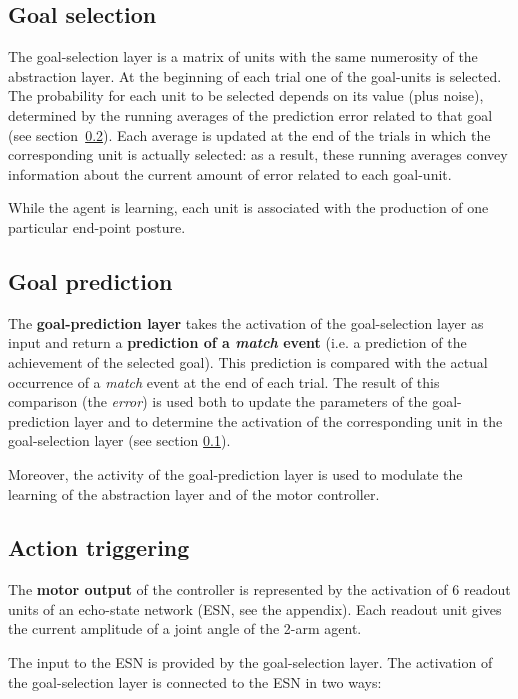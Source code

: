 \documentclass[11pt]{article}
\begin{document}
\subsection{Goal selection}
\label{sec:selection}

The goal-selection layer is a matrix of units with the same
numerosity of the abstraction layer. At the beginning of
each trial one of the goal-units is selected. The
probability for each unit to be selected depends on its
value (plus noise), determined by the running averages of
the prediction error related to that goal (see
section~\ref{sec:prediction}). Each average is updated at
the end of the trials in which the corresponding unit is
actually selected: as a result, these running averages
convey information about the current amount of error
related to each goal-unit. 

While the agent is learning, each unit is associated with
the production of one particular end-point posture. 

\subsection{Goal prediction}
\label{sec:prediction}

The \textbf{goal-prediction layer} takes the activation of
the goal-selection layer as input and return a
\textbf{prediction of a \emph{match} event} (i.e. a
prediction of the achievement of the selected goal). This
prediction is compared with the actual occurrence of a
\emph{match} event at the end of each trial.
The result of this comparison (the \emph{error}) is used
both to update the parameters of the goal-prediction layer
and to determine the activation of the corresponding unit in
the goal-selection layer (see section
\ref{sec:selection}).

Moreover, the activity of the goal-prediction layer is used
to modulate the learning of the abstraction layer and of the
motor controller.


\subsection{Action triggering}
\label{sec:actiontriggering}

The \textbf{motor output} of the controller is represented
by the activation of 6 readout units of an echo-state
network (ESN, see the appendix). Each readout unit gives
the current amplitude of a joint angle of the 2-arm agent.

The input to the ESN is provided by the goal-selection layer. The activation of
the goal-selection layer is connected to the ESN in two ways: 
\end{document}
